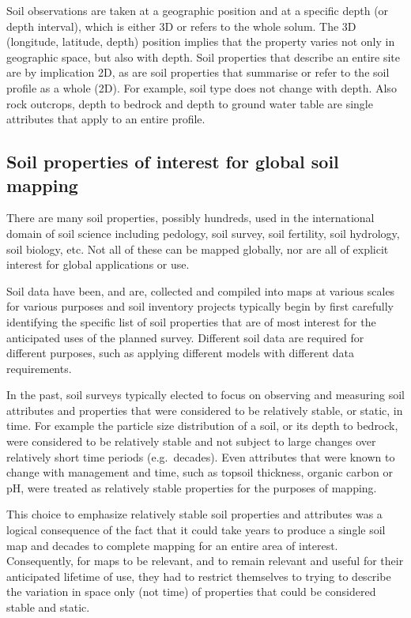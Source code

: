 \documentclass[graybox,natbib,nospthms,UStrade]{svmono}
\begin{document}
Soil observations are taken at a geographic position and at a specific
depth (or depth interval), which is either 3D or refers to the whole solum. The 3D
(longitude, latitude, depth) position implies that the property varies
not only in geographic space, but also with depth. Soil properties that
describe an entire site are by implication 2D, as are soil properties
that summarise or refer to the soil profile as a whole (2D). For
example, soil type does not change with depth. Also rock outcrops, depth
to bedrock and depth to ground water table are single attributes that apply to an entire profile.

\hypertarget{soil-properties-of-interest-for-global-soil-mapping}{%
\subsection{Soil properties of interest for global soil mapping}\label{soil-properties-of-interest-for-global-soil-mapping}}

There are many soil properties, possibly hundreds, used in the
international domain of soil science including pedology, soil survey,
soil fertility, soil hydrology, soil biology, etc. Not all of these can
be mapped globally, nor are all of explicit interest for global
applications or use.

Soil data have been, and are, collected and
compiled into maps at various scales for various purposes and soil
inventory projects typically begin by first carefully identifying the
specific list of soil properties that are of most interest for the
anticipated uses of the planned survey. Different soil data are required
for different purposes, such as applying different models with different
data requirements.

In the past, soil surveys typically elected to focus on observing
and measuring soil attributes and properties that were considered
to be relatively stable, or static, in time. For example the particle
size distribution of a soil, or its depth to bedrock, were considered
to be relatively stable and not subject to large changes over relatively
short time periods (e.g.~decades). Even attributes that were known to
change with management and time, such as topsoil thickness, organic carbon
or pH, were treated as relatively stable properties for the purposes of
mapping.

This choice to emphasize relatively stable soil properties and
attributes was a logical consequence of the fact that it could take years
to produce a single soil map and decades to complete mapping for an entire
area of interest. Consequently, for maps to be relevant, and to remain
relevant and useful for their anticipated lifetime of use, they had to
restrict themselves to trying to describe the variation in space only (not time)
of properties that could be considered stable and static.
\end{document}
